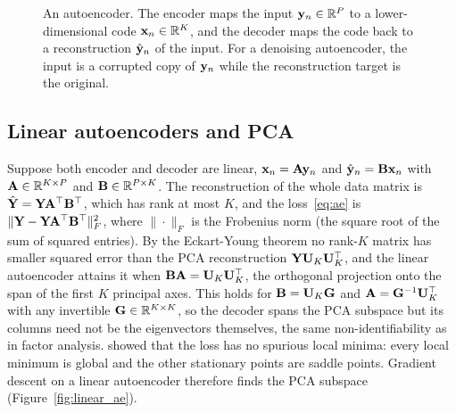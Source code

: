 \begin{figure}[tbp]
  \centering
  \caption{An autoencoder. The encoder maps the input $\mathbf{y}_n\in\mathbb{R}^P$ to a lower-dimensional code $\mathbf{x}_n\in\mathbb{R}^K$, and the decoder maps the code back to a reconstruction $\hat{\mathbf{y}}_n$ of the input. For a denoising autoencoder, the input is a corrupted copy of $\mathbf{y}_n$ while the reconstruction target is the original.}
  \label{fig:ae}
\end{figure}

\subsection{Linear autoencoders and PCA}

Suppose both encoder and decoder are linear, $\mathbf{x}_n=\mathbf{A}\mathbf{y}_n$ and $\hat{\mathbf{y}}_n=\mathbf{B}\mathbf{x}_n$ with $\mathbf{A}\in\mathbb{R}^{K\times P}$ and $\mathbf{B}\in\mathbb{R}^{P\times K}$. The reconstruction of the whole data matrix is $\hat{\mathbf{Y}}=\mathbf{Y}\mathbf{A}^\top\mathbf{B}^\top$, which has rank at most $K$, and the loss~\eqref{eq:ae} is $\|\mathbf{Y}-\mathbf{Y}\mathbf{A}^\top\mathbf{B}^\top\|_F^2$, where $\|\cdot\|_F$ is the Frobenius norm (the square root of the sum of squared entries). By the Eckart-Young theorem no rank-$K$ matrix has smaller squared error than the PCA reconstruction $\mathbf{Y}\mathbf{U}_K\mathbf{U}_K^\top$, and the linear autoencoder attains it when $\mathbf{B}\mathbf{A}=\mathbf{U}_K\mathbf{U}_K^\top$, the orthogonal projection onto the span of the first $K$ principal axes. This holds for $\mathbf{B}=\mathbf{U}_K\mathbf{G}$ and $\mathbf{A}=\mathbf{G}^{-1}\mathbf{U}_K^\top$ with any invertible $\mathbf{G}\in\mathbb{R}^{K\times K}$, so the decoder spans the PCA subspace but its columns need not be the eigenvectors themselves, the same non-identifiability as in factor analysis. \citet{baldi1989} showed that the loss has no spurious local minima: every local minimum is global and the other stationary points are saddle points. Gradient descent on a linear autoencoder therefore finds the PCA subspace (Figure~\ref{fig:linear_ae}).

